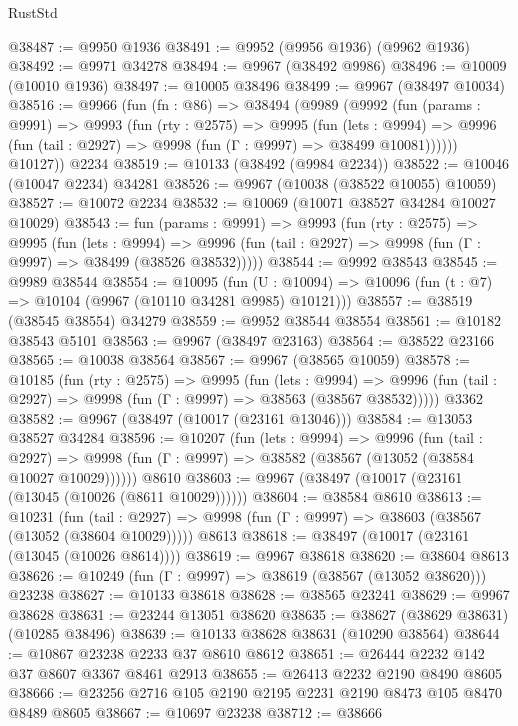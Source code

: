 \begin{lexlean}{RustStd}
\begin{coremodule}
@38487 := @9950 @1936
@38491 := @9952 (@9956 @1936) (@9962 @1936)
@38492 := @9971 @34278
@38494 := @9967 (@38492 @9986)
@38496 := @10009 (@10010 @1936)
@38497 := @10005 @38496
@38499 := @9967 (@38497 @10034)
@38516 := @9966
    (fun (fn : @86) =>
    @38494
      (@9989
        (@9992
          (fun (params : @9991) =>
          @9993
            (fun (rty : @2575) =>
            @9995
              (fun (lets : @9994) =>
              @9996 (fun (tail : @2927) => @9998 (fun (Γ : @9997) => @38499 @10081))))))
        @10127))
    @2234
@38519 := @10133 (@38492 (@9984 @2234))
@38522 := @10046 (@10047 @2234) @34281
@38526 := @9967 (@10038 (@38522 @10055) @10059)
@38527 := @10072 @2234
@38532 := @10069 (@10071 @38527 @34284 @10027 @10029)
@38543 := fun (params : @9991) =>
  @9993
    (fun (rty : @2575) =>
    @9995
      (fun (lets : @9994) =>
      @9996 (fun (tail : @2927) => @9998 (fun (Γ : @9997) => @38499 (@38526 @38532)))))
@38544 := @9992 @38543
@38545 := @9989 @38544
@38554 := @10095
    (fun (U : @10094) => @10096 (fun (t : @7) => @10104 (@9967 (@10110 @34281 @9985) @10121)))
@38557 := @38519 (@38545 @38554) @34279
@38559 := @9952 @38544 @38554
@38561 := @10182 @38543 @5101
@38563 := @9967 (@38497 @23163)
@38564 := @38522 @23166
@38565 := @10038 @38564
@38567 := @9967 (@38565 @10059)
@38578 := @10185
    (fun (rty : @2575) =>
    @9995
      (fun (lets : @9994) =>
      @9996 (fun (tail : @2927) => @9998 (fun (Γ : @9997) => @38563 (@38567 @38532)))))
    @3362
@38582 := @9967 (@38497 (@10017 (@23161 @13046)))
@38584 := @13053 @38527 @34284
@38596 := @10207
    (fun (lets : @9994) =>
    @9996
      (fun (tail : @2927) =>
      @9998 (fun (Γ : @9997) => @38582 (@38567 (@13052 (@38584 @10027 @10029))))))
    @8610
@38603 := @9967 (@38497 (@10017 (@23161 (@13045 (@10026 (@8611 @10029))))))
@38604 := @38584 @8610
@38613 := @10231
    (fun (tail : @2927) => @9998 (fun (Γ : @9997) => @38603 (@38567 (@13052 (@38604 @10029)))))
    @8613
@38618 := @38497 (@10017 (@23161 (@13045 (@10026 @8614))))
@38619 := @9967 @38618
@38620 := @38604 @8613
@38626 := @10249 (fun (Γ : @9997) => @38619 (@38567 (@13052 @38620))) @23238
@38627 := @10133 @38618
@38628 := @38565 @23241
@38629 := @9967 @38628
@38631 := @23244 @13051 @38620
@38635 := @38627 (@38629 @38631) (@10285 @38496)
@38639 := @10133 @38628 @38631 (@10290 @38564)
@38644 := @10867 @23238 @2233 @37 @8610 @8612
@38651 := @26444 @2232 @142 @37 @8607 @3367 @8461 @2913
@38655 := @26413 @2232 @2190 @8490 @8605
@38666 := @23256 @2716 @105 @2190 @2195 @2231 @2190 @8473 @105 @8470 @8489 @8605
@38667 := @10697 @23238
@38712 := @38666

\end{coremodule}
\end{lexlean}
